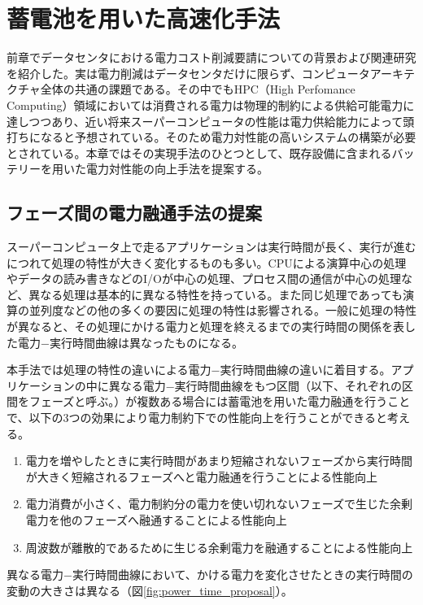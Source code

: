 \chapter{蓄電池を用いた高速化手法}
\label{chap:proposal}

前章でデータセンタにおける電力コスト削減要請についての背景および関連研究を紹介した。実は電力削減はデータセンタだけに限らず、コンピュータアーキテクチャ全体の共通の課題である。その中でもHPC（High Perfomance Computing）領域においては消費される電力は物理的制約による供給可能電力に達しつつあり、近い将来スーパーコンピュータの性能は電力供給能力によって頭打ちになると予想されている。そのため電力対性能の高いシステムの構築が必要とされている。本章ではその実現手法のひとつとして、既存設備に含まれるバッテリーを用いた電力対性能の向上手法を提案する。


\section{フェーズ間の電力融通手法の提案}
\label{sec:curb}

スーパーコンピュータ上で走るアプリケーションは実行時間が長く、実行が進むにつれて処理の特性が大きく変化するものも多い。CPUによる演算中心の処理やデータの読み書きなどのI/Oが中心の処理、プロセス間の通信が中心の処理など、異なる処理は基本的に異なる特性を持っている。また同じ処理であっても演算の並列度などの他の多くの要因に処理の特性は影響される。一般に処理の特性が異なると、その処理にかける電力と処理を終えるまでの実行時間の関係を表した電力−実行時間曲線は異なったものになる。

本手法では処理の特性の違いによる電力−実行時間曲線の違いに着目する。アプリケーションの中に異なる電力−実行時間曲線をもつ区間（以下、それぞれの区間をフェーズと呼ぶ。）が複数ある場合には蓄電池を用いた電力融通を行うことで、以下の3つの効果により電力制約下での性能向上を行うことができると考える。

\begin{enumerate}
\item 電力を増やしたときに実行時間があまり短縮されないフェーズから実行時間が大きく短縮されるフェーズへと電力融通を行うことによる性能向上
\item 電力消費が小さく、電力制約分の電力を使い切れないフェーズで生じた余剰電力を他のフェーズへ融通することによる性能向上
\item 周波数が離散的であるために生じる余剰電力を融通することによる性能向上
\end{enumerate}

異なる電力−実行時間曲線において、かける電力を変化させたときの実行時間の変動の大きさは異なる（図\ref{fig:power_time_proposal}）。

